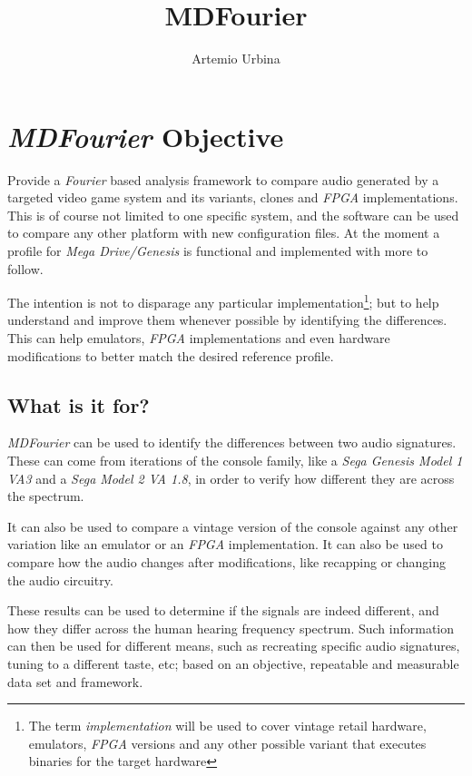 \documentclass[10pt,a4paper]{report}
\title{MDFourier}
\author{Artemio Urbina}
\begin{document}
\begin{titlepage}
	\maketitle
	\thispagestyle{empty}
\end{titlepage}

\tableofcontents

\chapter{\textit{MDFourier} Objective}

Provide a \textit{Fourier} based analysis framework to compare audio generated by a targeted video game system and its variants, clones and \textit{FPGA} implementations. This is of course not limited to one specific system, and the software can be used to compare any other platform with new configuration files. At the moment a profile for \textit{Mega Drive/Genesis} is functional and implemented with more to follow.

The intention is not to disparage any particular implementation\footnote{The term \textit{implementation} will be used to cover vintage retail hardware, emulators, \textit{FPGA} versions and any other possible variant that executes binaries for the target hardware}; but to help understand and improve them whenever possible by identifying the differences. This can help emulators, \textit{FPGA} implementations and even hardware modifications to better match the desired reference profile.

\section{What is it for?}

\textit{MDFourier} can be used to identify the differences between two audio signatures. These can come from iterations of the console family, like a \textit{Sega Genesis Model 1 VA3} and a \textit{Sega Model 2 VA 1.8}, in order to verify how different they are across the spectrum. 

It can also be used to compare a vintage version of the console against any other variation like an emulator or an \textit{FPGA} implementation. It can also be used to compare how the audio changes after modifications, like recapping or changing the audio circuitry.

These results can be used to determine if the signals are indeed different, and how they differ across the human hearing frequency spectrum. Such information can then be used for different means, such as recreating specific audio signatures, tuning to a different taste, etc; based on an objective, repeatable and measurable data set and framework.
\end{document}
